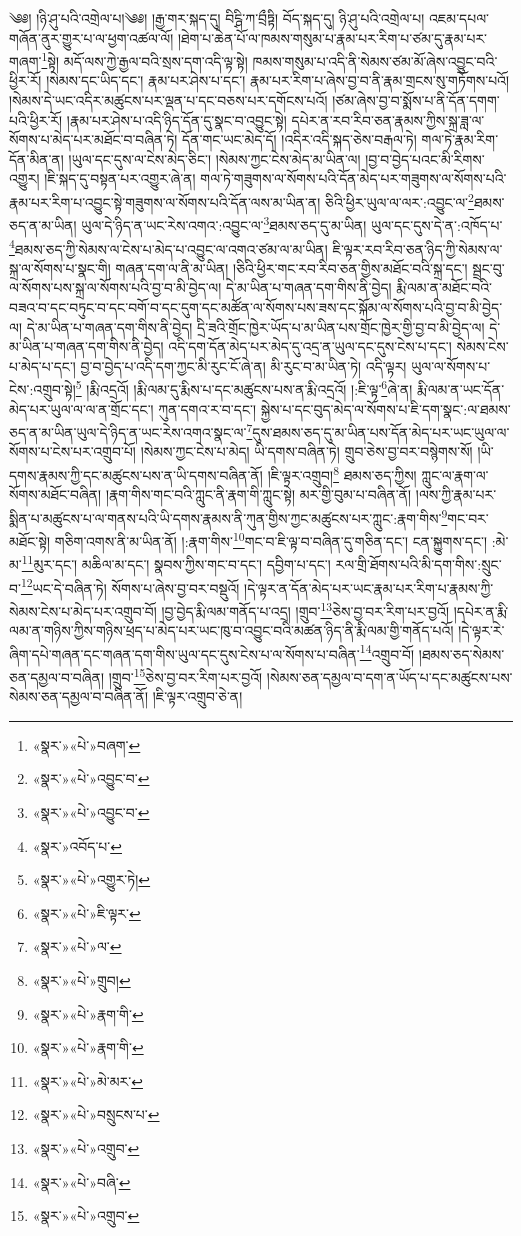 ༄༅། །ཉི་ཤུ་པའི་འགྲེལ་པ།༄༅། །རྒྱ་གར་སྐད་དུ། བིངྴི་ཀ་བྲྀཏྟི། བོད་སྐད་དུ། ཉི་ཤུ་པའི་འགྲེལ་པ། འཇམ་དཔལ་གཞོན་ནུར་གྱུར་པ་ལ་ཕྱག་འཚལ་ལོ། །ཐེག་པ་ཆེན་པོ་ལ་ཁམས་གསུམ་པ་རྣམ་པར་རིག་པ་ཙམ་དུ་རྣམ་པར་གཞག་\footnote{«སྣར་»«པེ་»བཞག་}སྟེ། མདོ་ལས་ཀྱེ་རྒྱལ་བའི་སྲས་དག་འདི་ལྟ་སྟེ། ཁམས་གསུམ་པ་འདི་ནི་སེམས་ཙམ་མོ་ཞེས་འབྱུང་བའི་ཕྱིར་རོ། །སེམས་དང་ཡིད་དང་། རྣམ་པར་ཤེས་པ་དང་། རྣམ་པར་རིག་པ་ཞེས་བྱ་བ་ནི་རྣམ་གྲངས་སུ་གཏོགས་པའོ། །སེམས་དེ་ཡང་འདིར་མཚུངས་པར་ལྡན་པ་དང་བཅས་པར་དགོངས་པའོ། །ཙམ་ཞེས་བྱ་བ་སྨོས་པ་ནི་དོན་དགག་པའི་ཕྱིར་རོ། །རྣམ་པར་ཤེས་པ་འདི་ཉིད་དོན་དུ་སྣང་བ་འབྱུང་སྟེ། དཔེར་ན་རབ་རིབ་ཅན་རྣམས་ཀྱིས་སྐྲ་ཟླ་ལ་སོགས་པ་མེད་པར་མཐོང་བ་བཞིན་ཏེ། དོན་གང་ཡང་མེད་དོ། །འདིར་འདི་སྐད་ཅེས་བརྒལ་ཏེ། གལ་ཏེ་རྣམ་རིག་དོན་མིན་ན། །ཡུལ་དང་དུས་ལ་ངེས་མེད་ཅིང་། །སེམས་ཀྱང་ངེས་མེད་མ་ཡིན་ལ། །བྱ་བ་བྱེད་པའང་མི་རིགས་འགྱུར། །ཇི་སྐད་དུ་བསྟན་པར་འགྱུར་ཞེ་ན། གལ་ཏེ་གཟུགས་ལ་སོགས་པའི་དོན་མེད་པར་གཟུགས་ལ་སོགས་པའི་རྣམ་པར་རིག་པ་འབྱུང་སྟེ་གཟུགས་ལ་སོགས་པའི་དོན་ལས་མ་ཡིན་ན། ཅིའི་ཕྱིར་ཡུལ་ལ་ལར་:འབྱུང་ལ་\footnote{«སྣར་»«པེ་»འབྱུང་བ་}ཐམས་ཅད་ན་མ་ཡིན། ཡུལ་དེ་ཉིད་ན་ཡང་རེས་འགའ་:འབྱུང་ལ་\footnote{«སྣར་»«པེ་»འབྱུང་བ་}ཐམས་ཅད་དུ་མ་ཡིན། ཡུལ་དང་དུས་དེ་ན་:འཁོད་པ་\footnote{«སྣར་»འབོད་པ་}ཐམས་ཅད་ཀྱི་སེམས་ལ་ངེས་པ་མེད་པ་འབྱུང་ལ་འགའ་ཙམ་ལ་མ་ཡིན། ཇི་ལྟར་རབ་རིབ་ཅན་ཉིད་ཀྱི་སེམས་ལ་སྐྲ་ལ་སོགས་པ་སྣང་གི། གཞན་དག་ལ་ནི་མ་ཡིན། །ཅིའི་ཕྱིར་གང་རབ་རིབ་ཅན་གྱིས་མཐོང་བའི་སྐྲ་དང་། སྦྲང་བུ་ལ་སོགས་པས་སྐྲ་ལ་སོགས་པའི་བྱ་བ་མི་བྱེད་ལ། དེ་མ་ཡིན་པ་གཞན་དག་གིས་ནི་བྱེད། རྨི་ལམ་ན་མཐོང་བའི་བཟའ་བ་དང་བཏུང་བ་དང་བགོ་བ་དང་དུག་དང་མཚོན་ལ་སོགས་པས་ཟས་དང་སྐོམ་ལ་སོགས་པའི་བྱ་བ་མི་བྱེད་ལ། དེ་མ་ཡིན་པ་གཞན་དག་གིས་ནི་བྱེད། དྲི་ཟའི་གྲོང་ཁྱེར་ཡོད་པ་མ་ཡིན་པས་གྲོང་ཁྱེར་གྱི་བྱ་བ་མི་བྱེད་ལ། དེ་མ་ཡིན་པ་གཞན་དག་གིས་ནི་བྱེད། འདི་དག་དོན་མེད་པར་མེད་དུ་འདྲ་ན་ཡུལ་དང་དུས་ངེས་པ་དང་། སེམས་ངེས་པ་མེད་པ་དང་། བྱ་བ་བྱེད་པ་འདི་དག་ཀྱང་མི་རུང་ངོ་ཞེ་ན། མི་རུང་བ་མ་ཡིན་ཏེ། འདི་ལྟར། ཡུལ་ལ་སོགས་པ་ངེས་:འགྲུབ་སྟེ།\footnote{«སྣར་»«པེ་»འགྱུར་ཏེ།} །རྨི་འདྲའོ། །རྨི་ལམ་དུ་རྨིས་པ་དང་མཚུངས་པས་ན་རྨི་འདྲའོ། །:ཇི་ལྟ་\footnote{«སྣར་»«པེ་»ཇི་ལྟར་}ཞེ་ན། རྨི་ལམ་ན་ཡང་དོན་མེད་པར་ཡུལ་ལ་ལ་ན་གྲོང་དང་། ཀུན་དགའ་ར་བ་དང་། སྐྱེས་པ་དང་བུད་མེད་ལ་སོགས་པ་ཇི་དག་སྣང་:ལ་ཐམས་ཅད་ན་མ་ཡིན་ཡུལ་དེ་ཉིད་ན་ཡང་རེས་འགའ་སྣང་ལ་\footnote{«སྣར་»«པེ་»ལ་}དུས་ཐམས་ཅད་དུ་མ་ཡིན་པས་དོན་མེད་པར་ཡང་ཡུལ་ལ་སོགས་པ་ངེས་པར་འགྲུབ་པོ། །སེམས་ཀྱང་ངེས་པ་མེད། ཡི་དགས་བཞིན་ཏེ། གྲུབ་ཅེས་བྱ་བར་བསྙེགས་སོ། །ཡི་དགས་རྣམས་ཀྱི་དང་མཚུངས་པས་ན་ཡི་དགས་བཞིན་ནོ། །ཇི་ལྟར་འགྲུབ།\footnote{«སྣར་»«པེ་»གྲུབ།} ཐམས་ཅད་ཀྱིས། ཀླུང་ལ་རྣག་ལ་སོགས་མཐོང་བཞིན། །རྣག་གིས་གང་བའི་ཀླུང་ནི་རྣག་གི་ཀླུང་སྟེ། མར་གྱི་བུམ་པ་བཞིན་ནོ། །ལས་ཀྱི་རྣམ་པར་སྨིན་པ་མཚུངས་པ་ལ་གནས་པའི་ཡི་དགས་རྣམས་ནི་ཀུན་གྱིས་ཀྱང་མཚུངས་པར་ཀླུང་:རྣག་གིས་\footnote{«སྣར་»«པེ་»རྣག་གི་}གང་བར་མཐོང་སྟེ། གཅིག་འགས་ནི་མ་ཡིན་ནོ། །:རྣག་གིས་\footnote{«སྣར་»«པེ་»རྣག་གི་}གང་བ་ཇི་ལྟ་བ་བཞིན་དུ་གཅིན་དང་། ངན་སྐྱུགས་དང་། :མེ་མ་\footnote{«སྣར་»«པེ་»མེ་མར་}མུར་དང་། མཆིལ་མ་དང་། སྣབས་ཀྱིས་གང་བ་དང་། དབྱིག་པ་དང་། རལ་གྲི་ཐོགས་པའི་མི་དག་གིས་:སྲུང་བ་\footnote{«སྣར་»«པེ་»བསྲུངས་པ་}ཡང་དེ་བཞིན་ཏེ། སོགས་པ་ཞེས་བྱ་བར་བསྡུའོ། །དེ་ལྟར་ན་དོན་མེད་པར་ཡང་རྣམ་པར་རིག་པ་རྣམས་ཀྱི་སེམས་ངེས་པ་མེད་པར་འགྲུབ་བོ། །བྱ་བྱེད་རྨི་ལམ་གནོད་པ་འདྲ། །གྲུབ་\footnote{«སྣར་»«པེ་»འགྲུབ་}ཅེས་བྱ་བར་རིག་པར་བྱའོ། །དཔེར་ན་རྨི་ལམ་ན་གཉིས་ཀྱིས་གཉིས་ཕྲད་པ་མེད་པར་ཡང་ཁུ་བ་འབྱུང་བའི་མཚན་ཉིད་ནི་རྨི་ལམ་གྱི་གནོད་པའོ། །དེ་ལྟར་རེ་ཞིག་དཔེ་གཞན་དང་གཞན་དག་གིས་ཡུལ་དང་དུས་ངེས་པ་ལ་སོགས་པ་བཞིན་\footnote{«སྣར་»«པེ་»བཞི་}འགྲུབ་བོ། །ཐམས་ཅད་སེམས་ཅན་དམྱལ་བ་བཞིན། །གྲུབ་\footnote{«སྣར་»«པེ་»འགྲུབ་}ཅེས་བྱ་བར་རིག་པར་བྱའོ། །སེམས་ཅན་དམྱལ་བ་དག་ན་ཡོད་པ་དང་མཚུངས་པས་སེམས་ཅན་དམྱལ་བ་བཞིན་ནོ། །ཇི་ལྟར་འགྲུབ་ཅེ་ན། 
